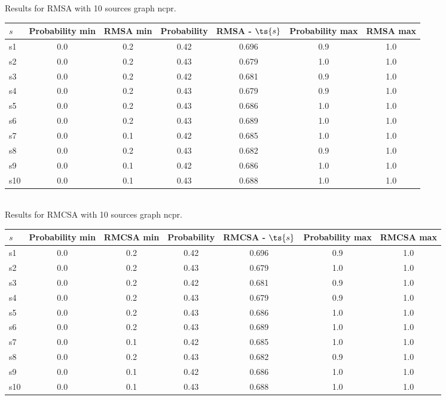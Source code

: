 \documentclass{article}
\begin{document}
\noindent Results for RMSA with 10 sources graph ncpr.

\noindent\begin{tabular}{|l|c|c|c|c|c|c|}
\hline
$s$& Probability min & RMSA min & Probability & RMSA - $\ts{s}$ & Probability max & RMSA max\\
\hline
s1 &0.0 & 0.2 & 0.42 & 0.696 & 0.9 & 1.0\\
\hline
s2 &0.0 & 0.2 & 0.43 & 0.679 & 1.0 & 1.0\\
\hline
s3 &0.0 & 0.2 & 0.42 & 0.681 & 0.9 & 1.0\\
\hline
s4 &0.0 & 0.2 & 0.43 & 0.679 & 0.9 & 1.0\\
\hline
s5 &0.0 & 0.2 & 0.43 & 0.686 & 1.0 & 1.0\\
\hline
s6 &0.0 & 0.2 & 0.43 & 0.689 & 1.0 & 1.0\\
\hline
s7 &0.0 & 0.1 & 0.42 & 0.685 & 1.0 & 1.0\\
\hline
s8 &0.0 & 0.2 & 0.43 & 0.682 & 0.9 & 1.0\\
\hline
s9 &0.0 & 0.1 & 0.42 & 0.686 & 1.0 & 1.0\\
\hline
s10 &0.0 & 0.1 & 0.43 & 0.688 & 1.0 & 1.0\\
\hline
\end{tabular}\\

\noindent Results for RMCSA with 10 sources graph ncpr.

\noindent\begin{tabular}{|l|c|c|c|c|c|c|}
\hline
$s$& Probability min & RMCSA min & Probability & RMCSA - $\ts{s}$ & Probability max & RMCSA max\\
\hline
s1 &0.0 & 0.2 & 0.42 & 0.696 & 0.9 & 1.0\\
\hline
s2 &0.0 & 0.2 & 0.43 & 0.679 & 1.0 & 1.0\\
\hline
s3 &0.0 & 0.2 & 0.42 & 0.681 & 0.9 & 1.0\\
\hline
s4 &0.0 & 0.2 & 0.43 & 0.679 & 0.9 & 1.0\\
\hline
s5 &0.0 & 0.2 & 0.43 & 0.686 & 1.0 & 1.0\\
\hline
s6 &0.0 & 0.2 & 0.43 & 0.689 & 1.0 & 1.0\\
\hline
s7 &0.0 & 0.1 & 0.42 & 0.685 & 1.0 & 1.0\\
\hline
s8 &0.0 & 0.2 & 0.43 & 0.682 & 0.9 & 1.0\\
\hline
s9 &0.0 & 0.1 & 0.42 & 0.686 & 1.0 & 1.0\\
\hline
s10 &0.0 & 0.1 & 0.43 & 0.688 & 1.0 & 1.0\\
\hline
\end{tabular}\\
\end{document}
